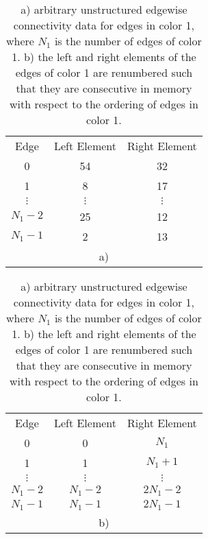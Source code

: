 \documentclass[12pt]{article}
\begin{document}
\begin{table}

	
	\begin{tabular}{c|c|c}
		Edge & Left Element & Right Element \\ 
		\cline{2-3} 0 & 54 & 32 \\ 
		\cline{2-3} 1 & 8 & 17 \\ 
		\cline{2-3} $\vdots$ & $\vdots$ & $\vdots$ \\ 
		\cline{2-3} $N_1-2$ & 25 & 12 \\ 
		\cline{2-3} $N_1-1$ & 2 & 13 \\ 
		
		\multicolumn{3}{c}{a)}
	\end{tabular} 
	\quad
	\begin{tabular}{c|c|c}
		Edge & Left Element & Right Element \\ 
		\cline{2-3} 0 & 0 & $N_1$ \\ 
		\cline{2-3} 1 & 1 & $N_1+1$ \\ 
		\cline{2-3} $\vdots$ & $\vdots$ & $\vdots$ \\ 
		\cline{2-3} $N_1-2$ & $N_1-2$ & $2N_1-2$ \\ 
		\cline{2-3} $N_1-1$ & $N_1-1$ & $2N_1-1$ \\
		
		\multicolumn{3}{c}{b)}
	\end{tabular} 
	\caption{a) arbitrary unstructured edgewise connectivity data for edges in color 1, where $N_1$ is the number of edges of color 1. b) the left and right elements of the edges of color 1 are renumbered such that they are consecutive in memory with respect to the ordering of edges in color 1.}
	\label{tab:connectivity}
\end{table}
\end{document}
